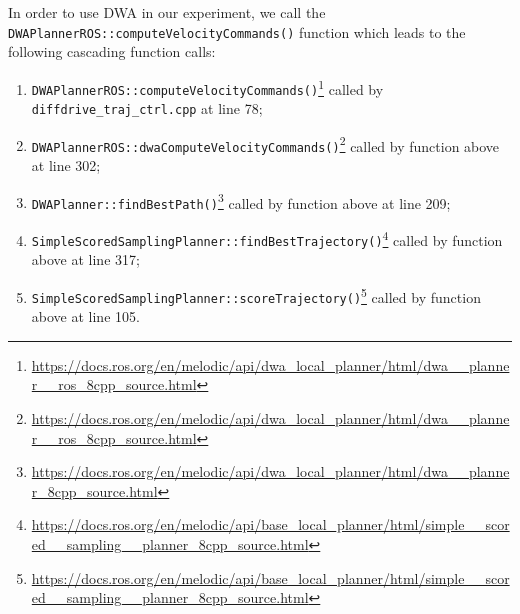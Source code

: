 \documentclass[11pt,a4paper]{article}
\begin{document}
In order to use DWA in our experiment, we call the \texttt{DWAPlannerROS::computeVelocityCommands()} function which leads to the following cascading function calls:\\
\begin{enumerate}

    \item \texttt{DWAPlannerROS::computeVelocityCommands()}\footnote
    {\href{https://docs.ros.org/en/melodic/api/dwa\_local\_planner/html/dwa\_\_planner\_\_ros\_8cpp\_source.html}
    {https://docs.ros.org/en/melodic/api/dwa\_local\_planner/html/dwa\_\_planner\_\_ros\_8cpp\_source.html}}
    called by \texttt{diffdrive\_traj\_ctrl.cpp} at line 78;

    \item \texttt{DWAPlannerROS::dwaComputeVelocityCommands()}\footnote
    {\href{https://docs.ros.org/en/melodic/api/dwa\_local\_planner/html/dwa\_\_planner\_\_ros\_8cpp\_source.html}
    {https://docs.ros.org/en/melodic/api/dwa\_local\_planner/html/dwa\_\_planner\_\_ros\_8cpp\_source.html}}
    called by function above at line 302;

    \item \texttt{DWAPlanner::findBestPath()}\footnote
    {\href{https://docs.ros.org/en/melodic/api/dwa\_local\_planner/html/dwa\_\_planner\_8cpp\_source.html}
    {https://docs.ros.org/en/melodic/api/dwa\_local\_planner/html/dwa\_\_planner\_8cpp\_source.html}}
    called by function above at line 209;

    \item \texttt{SimpleScoredSamplingPlanner::findBestTrajectory()}\footnote
    {\href{https://docs.ros.org/en/melodic/api/base\_local\_planner/html/simple\_\_scored\_\_sampling\_\_planner\_8cpp\_source.html}
    {https://docs.ros.org/en/melodic/api/base\_local\_planner/html/simple\_\_scored\_\_sampling\_\_planner\_8cpp\_source.html}}
    called by function above at line 317;

    \item \texttt{SimpleScoredSamplingPlanner::scoreTrajectory()}\footnote
    {\href{https://docs.ros.org/en/melodic/api/base\_local\_planner/html/simple\_\_scored\_\_sampling\_\_planner\_8cpp\_source.html}
    {https://docs.ros.org/en/melodic/api/base\_local\_planner/html/simple\_\_scored\_\_sampling\_\_planner\_8cpp\_source.html}}
    called by function above at line 105.\\

\end{enumerate}
\end{document}

